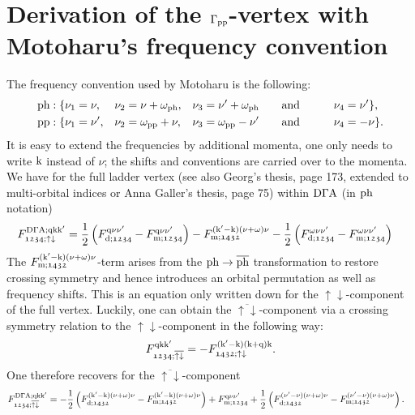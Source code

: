 \documentclass[main.tex]{subfiles}
\begin{document}
\section{Derivation of the $\Gamma_{\text{pp}}$-vertex with Motoharu's frequency convention}

The frequency convention used by Motoharu is the following:
\begin{subequations}
\begin{align}
	&\text{ph}: \{\nu_1=\nu,&&\nu_2=\nu+\omega_{\text{ph}},&&\nu_3=\nu'+\omega_{\text{ph}}\qquad\text{and}\qquad&&\nu_4=\nu' \}, \\
	&\text{pp}: \{\nu_1=\nu',&&\nu_2=\omega_{\text{pp}}+\nu,&&\nu_3=\omega_{\text{pp}}-\nu'\qquad\text{and}\qquad&&\nu_4=-\nu \}.
\end{align}
\end{subequations}
It is easy to extend the frequencies by additional momenta, one only needs to write $\text{k}$ instead of $\nu$; the shifts and conventions are carried over to the momenta. We have for the full ladder vertex (see also Georg's thesis, page 173, extended to multi-orbital indices or Anna Galler's thesis, page 75) within $\text{D}\Gamma\text{A}$ (in $\text{ph}$ notation)
\begin{align}
	F^{\text{D}\Gamma\text{A};\text{q}\text{k}\text{k}'}_{\mathfrak{1234};\uparrow\downarrow}&=\frac12\left (F_{\text{d};\mathfrak{1234}}^{\text{q}\nu\nu'}-F_{\text{m};\mathfrak{1234}}^{\text{q}\nu\nu'}\right )-F_{\text{m};\mathfrak{1432}}^{(\text{k}'-\text{k})(\nu+\omega)\nu}-\frac12\left (F_{\text{d};\mathfrak{1234}}^{\omega\nu\nu'}-F_{\text{m};\mathfrak{1234}}^{\omega\nu\nu'}\right )
\end{align}
The $F_{\text{m};\mathfrak{1432}}^{(\text{k}'-\text{k})(\nu+\omega)\nu}$-term arises from the $\text{ph}\to\overline{\text{ph}}$ transformation to restore crossing symmetry and hence introduces an orbital permutation as well as frequency shifts. This is an equation only written down for the $\uparrow\downarrow$-component of the full vertex. Luckily, one can obtain the $\overline{\uparrow\downarrow}$-component via a crossing symmetry relation to the $\uparrow\downarrow$-component in the following way:
\begin{align}
	F^{\text{q}\text{k}\text{k}'}_{\mathfrak{1234};\overline{\uparrow\downarrow}}=-F^{(\text{k}'-\text{k})(\text{k}+\text{q})\text{k}}_{\mathfrak{1432};\uparrow\downarrow}.
\end{align}
One therefore recovers for the $\overline{\uparrow\downarrow}$-component
\begin{align}
	F^{\text{D}\Gamma\text{A};\text{q}\text{k}\text{k}'}_{\mathfrak{1234};\overline{\uparrow\downarrow}}&=-\frac12\left (F_{\text{d};\mathfrak{1432}}^{(\text{k}'-\text{k})(\nu+\omega)\nu}-F_{\text{m};\mathfrak{1432}}^{(\text{k}'-\text{k})(\nu+\omega)\nu}\right )+F_{\text{m};\mathfrak{1234}}^{\text{q}\nu\nu'}+\frac12\left (F_{\text{d};\mathfrak{1432}}^{(\nu'-\nu)(\nu+\omega)\nu}-F_{\text{m};\mathfrak{1432}}^{(\nu'-\nu)(\nu+\omega)\nu}\right ).
\end{align}
\end{document}
